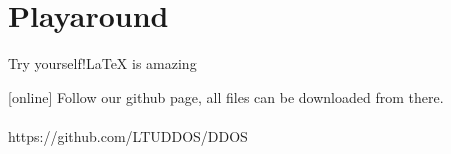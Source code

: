 \section{Playaround}
\begin{frame}{Try yourself!}{\LaTeX \mbox{} is amazing}
\begin{thebibliography}{9}
	[online]
	 Follow our github page, all files can be downloaded from there. \\ \ \\
	\small https://github.com/LTUDDOS/DDOS \normalsize
\end{thebibliography}	
\end{frame}
